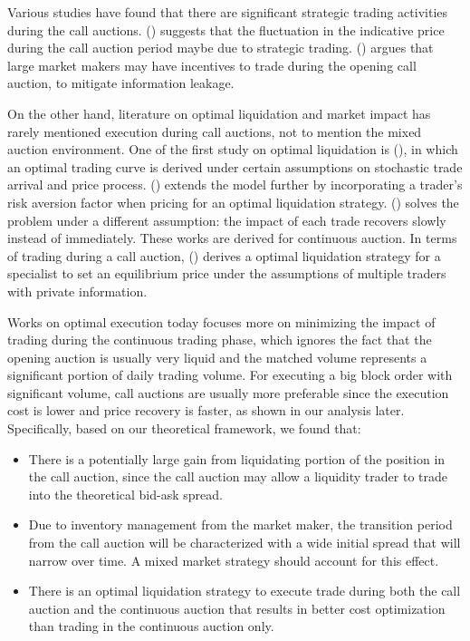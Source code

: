 \documentclass{article}
\begin{document}
Various studies have found that there are significant strategic trading activities during the call auctions. (\cite{Bruno1999}) suggests that the fluctuation in the indicative price during the call auction period maybe due to strategic trading. (\cite{Vives2001}) argues that large market makers may have incentives to trade during the opening call auction, to mitigate information leakage.

On the other hand, literature on optimal liquidation and market impact has rarely mentioned execution during call auctions, not to mention the mixed auction environment. One of the first study on optimal liquidation is (\cite{HoStoll1981}), in which an optimal trading curve is derived under certain assumptions on stochastic trade arrival and price process. (\cite{AlmgrenChriss2000}) extends the model further by incorporating a trader's risk aversion factor when pricing for an optimal liquidation strategy. (\cite{Obizhaeva2013}) solves the problem under a different assumption: the impact of each trade recovers slowly instead of immediately. These works are derived for continuous auction. In terms of trading during a call auction, (\cite{Madhavan2015}) derives a optimal liquidation strategy for a specialist to set an equilibrium price under the assumptions of multiple traders with private information.

Works on optimal execution today focuses more on minimizing the impact of trading during the continuous trading phase, which ignores the fact that the opening auction is usually very liquid and the matched volume represents a significant portion of daily trading volume. For executing a big block order with significant volume, call auctions are usually more preferable since the execution cost is lower and price recovery is faster, as shown in our analysis later. Specifically, based on our theoretical framework, we found that:

\begin{itemize}
  \item There is a potentially large gain from liquidating portion of the position in the call auction, since the call auction may allow a liquidity trader to trade into the theoretical bid-ask spread.
  \item Due to inventory management from the market maker, the transition period from the call auction will be characterized with a wide initial spread that will narrow over time. A mixed market strategy should account for this effect.
  \item There is an optimal liquidation strategy to execute trade during both the call auction and the continuous auction that results in better cost optimization than trading in the continuous auction only.
\end{itemize}
\end{document}
